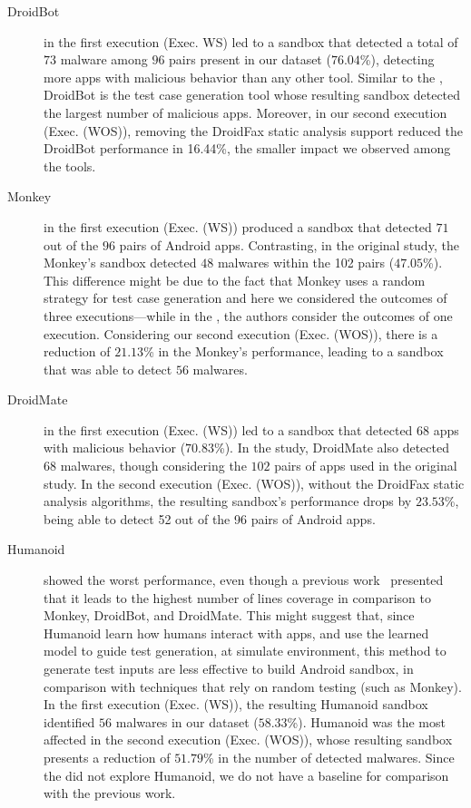 \begin{description}
\item[DroidBot] in the first execution (Exec. WS) led to a sandbox that detected a total of $73$ malware among $96$ pairs present in our dataset ($76.04$\%),
  detecting more apps with malicious behavior than any other tool. Similar to the \blls, DroidBot is the test case generation tool
  whose resulting sandbox detected the largest number of malicious apps. Moreover, in our second execution (Exec. (WOS)), removing the DroidFax
  static analysis support reduced the DroidBot performance in 16.44\%, the smaller impact we observed among the tools.

  \item[Monkey] in the first execution (Exec. (WS)) produced a sandbox that detected $71$ out of the $96$ pairs of Android apps.
    Contrasting, in the original study, the Monkey's sandbox detected $48$ malwares within the 102 pairs ($47.05$\%). This difference
    might be due to the fact that Monkey uses a random strategy for test case generation and here we considered the outcomes
    of three executions---while in the \blls, the authors consider the outcomes of one execution. 
    Considering our second execution (Exec. (WOS)), there is a reduction of $21.13$\% in the Monkey's performance, leading to
    a sandbox that was able to detect $56$ malwares. 

  \item[DroidMate] in the first execution (Exec. (WS)) led to a sandbox that detected 68 apps with malicious behavior ($70.83$\%).
    In the \blls study, DroidMate also detected $68$ malwares, though considering the $102$ pairs of apps used in the
    original study. In the second execution (Exec. (WOS)),
    without the DroidFax static analysis algorithms, the resulting sandbox's performance drops by $23.53$\%, being able to detect
    52 out of the 96 pairs of Android apps.
    
  \item[Humanoid] showed the worst performance, even though a previous work~\cite{DBLP:conf/kbse/LiY0C19} presented that it leads to
    the highest number of lines coverage in comparison to Monkey, DroidBot, and DroidMate. This might suggest that, since Humanoid learn how humans interact with apps, and use the learned model to guide test generation, at simulate environment, this method to generate test inputs are less effective to build Android sandbox, in comparison with techniques that rely on random testing (such as Monkey). In the first execution (Exec. (WS)),
    the resulting Humanoid sandbox identified $56$ malwares in our dataset ($58.33$\%). Humanoid was the most affected in the second
    execution (Exec. (WOS)), whose resulting sandbox presents a reduction of $51.79$\%  in the number of detected malwares.
    Since the \blls did not explore Humanoid,
    we do not have a baseline for comparison with the previous work.


\end{description}
